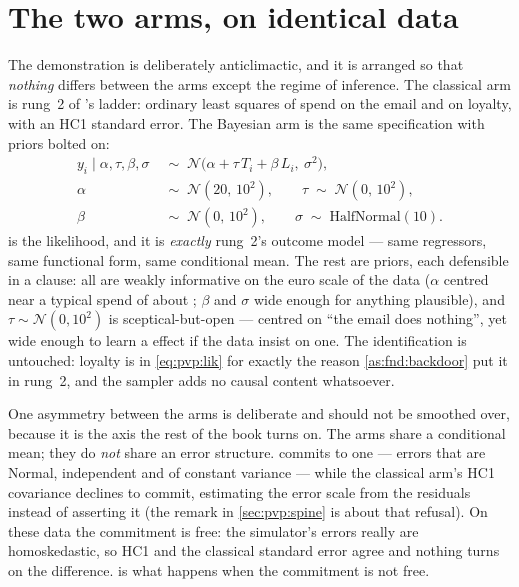 \section{The two arms, on identical data}
\label{sec:pvp:arms}

The demonstration is deliberately anticlimactic, and it is arranged so that \emph{nothing}
differs between the arms except the regime of inference. The classical arm is rung~2 of
's ladder: ordinary least squares of spend on the email and on loyalty, with an HC1
standard error. The Bayesian arm is the same specification with priors bolted on:
%
\begin{align}
  y_i \;\big|\; \alpha, \tau, \beta, \sigma
    &\;\sim\; \mathcal N\big(\alpha + \tau\,T_i + \beta\,L_i,\ \sigma^{2}\big),
    \label{eq:pvp:lik}\\
  \alpha &\;\sim\; \mathcal N(20,\, 10^{2}), \qquad
  \tau \;\sim\; \mathcal N(0,\, 10^{2}), \label{eq:pvp:prior_tau}\\
  \beta &\;\sim\; \mathcal N(0,\, 10^{2}), \qquad
  \sigma \;\sim\; \text{HalfNormal}(10). \label{eq:pvp:prior_sig}
\end{align}
%
 is the likelihood, and it is \emph{exactly} rung~2's outcome model --- same
regressors, same functional form, same conditional mean. The rest are priors, each
defensible in a clause: all are weakly informative on the euro scale of the data ($\alpha$
centred near a typical spend of about ; $\beta$ and $\sigma$ wide enough for anything
plausible), and $\tau \sim \mathcal N(0, 10^2)$ is sceptical-but-open --- centred on ``the email
does nothing'', yet wide enough to learn a  effect if the data insist on one. The
identification is untouched: loyalty is in \cref{eq:pvp:lik} for exactly the reason
\cref{as:fnd:backdoor} put it in rung~2, and the sampler adds no causal content whatsoever.

One asymmetry between the arms is deliberate and should not be smoothed over, because it is the
axis the rest of the book turns on. The arms share a conditional mean; they do \emph{not} share an
error structure.  commits to one --- errors that are Normal, independent and of
constant variance --- while the classical arm's HC1 covariance declines to commit, estimating the
error scale from the residuals instead of asserting it (the remark in \cref{sec:pvp:spine} is about
that refusal). On these data the commitment is free: the simulator's errors really are
homoskedastic, so HC1 and the classical standard error agree and nothing turns on the difference.
 is what happens when the commitment is not free.

